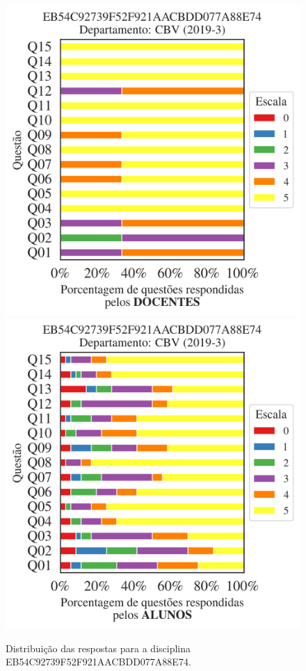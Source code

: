 \documentclass[a4paper,10pt]{article}
\begin{document}
\begin{figure}[h]
\centering
\includegraphics[width=0.485\linewidth]{analise_disciplina_departamento_CBV_EB54C92739F52F921AACBDD077A88E74_docentes.png}
\includegraphics[width=0.485\linewidth]{analise_disciplina_departamento_CBV_EB54C92739F52F921AACBDD077A88E74_alunos.png}
\caption{\label{fig:analise_geral_departamento}                Distribuição das respostas para a disciplina EB54C92739F52F921AACBDD077A88E74. }
\end{figure}
\end{document}
